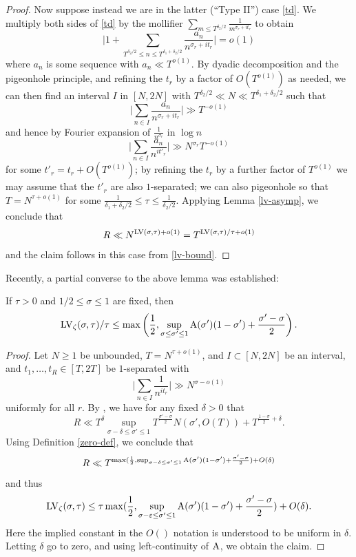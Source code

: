 \begin{proof}
Now suppose instead we are in the latter (``Type II'') case \eqref{td}.  We multiply both sides of \eqref{td} by the mollifier $\sum_{m \leq T^{\delta_2/2}} \frac{1}{m^{\sigma_r+it_r}}$ to obtain
$$ \bigg| 1 + \sum_{T^{\delta_2/2} \leq n \leq T^{\delta_1+\delta_2/2}} \frac{a_n}{n^{\sigma_r+it_r}} \bigg| = o(1)$$
where $a_n$ is some sequence with $a_n \ll T^{o(1)}$.  By dyadic decomposition and the pigeonhole principle, and refining the $t_r$ by a factor of $O(T^{o(1)})$ as needed, we can then find an interval $I$ in $[N,2N]$ with $T^{\delta_2/2} \ll N \ll T^{\delta_1+\delta_2/2}$ such that
$$ \bigg| \sum_{n \in I} \frac{a_n}{n^{\sigma_r+it_r}} \bigg| \gg T^{-o(1)}$$
and hence by Fourier expansion of $\frac{1}{n^{\sigma_r}}$ in $\log n$
$$ \bigg| \sum_{n \in I} \frac{a_n}{n^{it'_r}} \bigg| \gg N^{\sigma_r} T^{-o(1)}$$
for some $t'_r = t_r + O(T^{o(1)})$; by refining the $t_r$ by a further factor of $T^{o(1)}$ we may assume that the $t'_r$ are also $1$-separated; we can also pigeonhole so that $T = N^{\tau+o(1)}$ for some $\frac{1}{\delta_1+\delta_2/2} \leq \tau \leq \frac{1}{\delta_2/2}$.  Applying Lemma \ref{lv-asymp}, we conclude that
$$ R \ll N^{\mathrm{LV}(\sigma,\tau)+o(1)} = T^{\mathrm{LV}(\sigma,\tau)/\tau+o(1)}$$
and the claim follows in this case from \eqref{lv-bound}.
\end{proof}

Recently, a partial converse to the above lemma was established:

\begin{lemma}\label{zero-dens_implies_large}\cite[Theorem 1.2]{matomaki_teravainen_2024} If $\tau > 0$ and $1/2 \leq \sigma \leq 1$ are fixed, then
    $$ \mathrm{LV}_\zeta(\sigma,\tau)/\tau \leq \max\left( \frac{1}{2}, \sup_{\sigma \leq \sigma' \leq 1} \mathrm{A}(\sigma')(1-\sigma') + \frac{\sigma'-\sigma}{2} \right).$$
\end{lemma}

\begin{proof}  Let $N \geq 1$ be unbounded, $T = N^{\tau+o(1)}$, and $I \subset [N,2N]$ be an interval, and $t_1,\dots,t_R \in [T,2T]$ be $1$-separated with
$$ \bigg| \sum_{n \in I} \frac{1}{n^{it_r}} \bigg| \gg N^{\sigma-o(1)}$$
uniformly for all $r$.  By \cite[Theorem 1.2]{matomaki_teravainen_2024}, we have for any fixed $\delta>0$ that
$$ R \ll T^\delta \sup_{\sigma-\delta \leq \sigma' \leq 1} T^{\frac{\sigma' - \sigma}{2}} N(\sigma', O(T)) + T^{\frac{1-\sigma}{2}+\delta}.$$
Using Definition \ref{zero-def}, we conclude that
$$ R \ll T^{\max( \frac{1}{2}, \sup_{\sigma-\delta \leq \sigma' \leq 1} \mathrm{A}(\sigma')(1-\sigma') + \frac{\sigma'-\sigma}{2} ) + O(\delta)}$$
and thus
$$ \mathrm{LV}_\zeta(\sigma,\tau) \leq \tau \max( \frac{1}{2}, \sup_{\sigma-\varepsilon \leq \sigma' \leq 1} \mathrm{A}(\sigma')(1-\sigma') + \frac{\sigma'-\sigma}{2} ) + O(\delta).$$
Here the implied constant in the $O()$ notation is understood to be uniform in $\delta$.
Letting $\delta$ go to zero, and using left-continuity of $\mathrm{A}$, we obtain the claim.
\end{proof}

